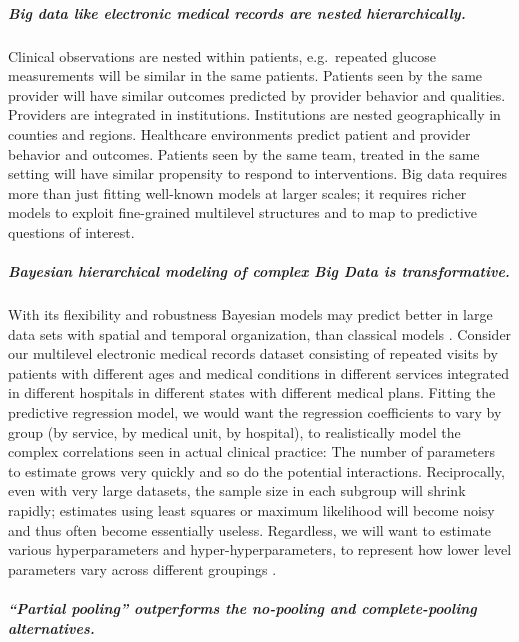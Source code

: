 \documentclass[]{article}
\begin{document}
\subparagraph{Big data like electronic medical records are nested
hierarchically.}\label{big-data-like-electronic-medical-records-are-nested-hierarchically.}

Clinical observations are nested within patients, e.g.~repeated glucose
measurements will be similar in the same patients. Patients seen by the
same provider will have similar outcomes predicted by provider behavior
and qualities. Providers are integrated in institutions. Institutions
are nested geographically in counties and regions. Healthcare
environments predict patient and provider behavior and outcomes.
Patients seen by the same team, treated in the same setting will have
similar propensity to respond to interventions. Big data requires more
than just fitting well-known models at larger scales; it requires richer
models to exploit fine-grained multilevel structures and to map to
predictive questions of interest.

\subparagraph{Bayesian hierarchical modeling of complex Big Data is
transformative.}\label{bayesian-hierarchical-modeling-of-complex-big-data-is-transformative.}

With its flexibility and robustness Bayesian models may predict better
in large data sets with spatial and temporal organization, than
classical models \cite{Gelman_red_2009}. Consider our multilevel
electronic medical records dataset consisting of repeated visits by
patients with different ages and medical conditions in different
services integrated in different hospitals in different states with
different medical plans. Fitting the predictive regression model, we
would want the regression coefficients to vary by group (by service, by
medical unit, by hospital), to realistically model the complex
correlations seen in actual clinical practice: The number of parameters
to estimate grows very quickly and so do the potential interactions.
Reciprocally, even with very large datasets, the sample size in each
subgroup will shrink rapidly; estimates using least squares or maximum
likelihood will become noisy and thus often become essentially useless.
Regardless, we will want to estimate various hyperparameters and
hyper-hyperparameters, to represent how lower level parameters vary
across different groupings \cite{Bafumi_Gelman_2007}.

\subparagraph{``Partial pooling'' outperforms the no-pooling and
complete-pooling
alternatives.}\label{partial-pooling-outperforms-the-no-pooling-and-complete-pooling-alternatives.}
\end{document}
